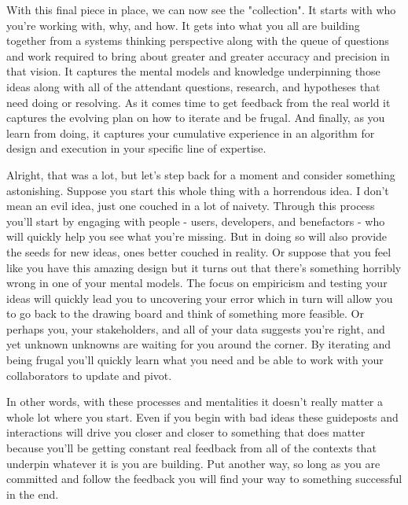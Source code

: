\documentclass[11pt,a5paper]{book}
\begin{document}
With this final piece in place, we can now see the "collection". It starts with who you're working with, why, and how. It gets into what you all are building together from a systems thinking perspective along with the queue of questions and work required to bring about greater and greater accuracy and precision in that vision. It captures the mental models and knowledge underpinning those ideas along with all of the attendant questions, research, and hypotheses that need doing or resolving. As it comes time to get feedback from the real world it captures the evolving plan on how to iterate and be frugal. And finally, as you learn from doing, it captures your cumulative experience in an algorithm for design and execution in your specific line of expertise.
\newline

Alright, that was a lot, but let's step back for a moment and consider something astonishing. Suppose you start this whole thing with a horrendous idea. I don't mean an evil idea, just one couched in a lot of naivety. Through this process you'll start by engaging with people - users, developers, and benefactors - who will quickly help you see what you're missing. But in doing so will also provide the seeds for new ideas, ones better couched in reality. Or suppose that you feel like you have this amazing design but it turns out that there's something horribly wrong in one of your mental models. The focus on empiricism and testing your ideas will quickly lead you to uncovering your error which in turn will allow you to go back to the drawing board and think of something more feasible. Or perhaps you, your stakeholders, and all of your data suggests you're right, and yet unknown unknowns are waiting for you around the corner. By iterating and being frugal you'll quickly learn what you need and be able to work with your collaborators to update and pivot.
\newline

In other words, with these processes and mentalities it doesn't really matter a whole lot where you start. Even if you begin with bad ideas these guideposts and interactions will drive you closer and closer to something that does matter because you'll be getting constant real feedback from all of the contexts that underpin whatever it is you are building. Put another way, so long as you are committed and follow the feedback you will find your way to something successful in the end. 
\newline
\end{document}
